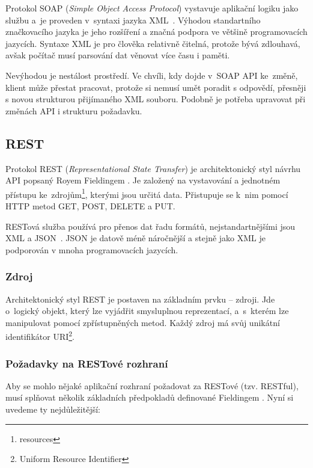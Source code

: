 Protokol SOAP (\textit{Simple Object Access Protocol}) vystavuje aplikační logiku jako službu
a~je proveden v~syntaxi jazyka XML~\cite{xml}. Výhodou standartního značkovacího jazyka je jeho rozšíření
a značná podpora ve většině programovacích jazycích. Syntaxe XML je pro člověka relativně čitelná,
protože bývá zdlouhavá, avšak počítač musí parsování dat věnovat více času i paměti.

Nevýhodou je nestálost prostředí. Ve chvíli, kdy dojde v~SOAP API ke~změ\-ně, klient může přestat pracovat,
protože si nemusí umět poradit s odpovědí, přesněji s novou strukturou přijímaného XML souboru.
Podobně je potřeba upravovat při změnách API i strukturu požadavku.

 
\subsection{REST}

Protokol REST (\textit{Representational State Transfer}) je architektonický styl návrhu API popsaný Royem Fieldingem \cite{fielding}.
Je založený na vystavování a jednotném přístupu ke~zdrojům\footnote{resources}, kterými jsou určitá data.
Přistupuje se k~nim pomocí HTTP metod GET, POST, DELETE a PUT.

RESTová služba používá pro přenos dat řadu formátů, nejstandartnějšími jsou XML a JSON~\cite{json}.
JSON je datově méně náročnější a stejně jako XML je podporován v mnoha programovacích jazycích.

\subsubsection*{Zdroj}

Architektonický styl REST je postaven na základním prvku -- zdroji. Jde o~logický objekt,
který lze vyjádřit smysluplnou reprezentací, a~s~kterém lze manipulovat pomocí zpřístupněných metod.
Každý zdroj má svůj unikátní identifikátor URI\footnote{Uniform Resource Identifier}.

\subsubsection*{Požadavky na RESTové rozhraní}

Aby se mohlo nějaké aplikační rozhraní požadovat za RESTové (tzv. RESTful),
musí splňovat několik základních předpokladů definované Fieldingem \cite{fielding}.
Nyní si uvedeme ty nejdůležitější:

